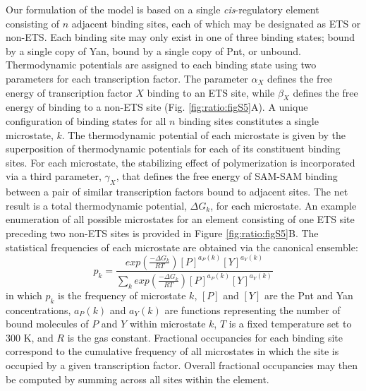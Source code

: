 Our formulation of the model is based on a single \textit{cis}-regulatory element consisting of $n$ adjacent binding sites, each of which may be designated as ETS or non-ETS. Each binding site may only exist in one of three binding states; bound by a single copy of Yan, bound by a single copy of Pnt, or unbound. Thermodynamic potentials are assigned to each binding state using two parameters for each transcription factor. The parameter $\alpha_X$ defines the free energy of transcription factor $X$ binding to an ETS site, while $\beta_X$ defines the free energy of binding to a non-ETS site (Fig. \ref{fig:ratio:figS5}A). A unique configuration of binding states for all $n$ binding sites constitutes a single microstate, $k$. The thermodynamic potential of each microstate is given by the superposition of thermodynamic potentials for each of its constituent binding sites. For each microstate, the stabilizing effect of polymerization is incorporated via a third parameter, $\gamma_X$, that defines the free energy of SAM-SAM binding between a pair of similar transcription factors bound to adjacent sites. The net result is a total thermodynamic potential, $\Delta G_k$, for each microstate. An example enumeration of all possible microstates for an element consisting of one ETS site preceding two non-ETS sites is provided in Figure \ref{fig:ratio:figS5}B. The statistical frequencies of each microstate are obtained via the canonical ensemble:
\begin{equation}
p_k = \frac{\displaystyle exp( \frac{-\Delta G_k}{RT} ) [P]^{a_P(k)}[Y]^{a_Y(k)} } {\displaystyle \sum_{k} {exp(\frac{-\Delta G_k}{RT})[P]^{a_P(k)}[Y]^{a_Y(k)}}}
\end{equation}
in which $p_k$ is the frequency of microstate $k$, $[P]$ and $[Y]$ are the Pnt and Yan concentrations, $a_P(k)$ and $a_Y(k)$ are functions representing the number of bound molecules of $P$ and $Y$ within microstate $k$, $T$ is a fixed temperature set to 300 K, and $R$ is the gas constant. Fractional occupancies for each binding site correspond to the cumulative frequency of all microstates in which the site is occupied by a given transcription factor. Overall fractional occupancies may then be computed by summing across all sites within the element.

